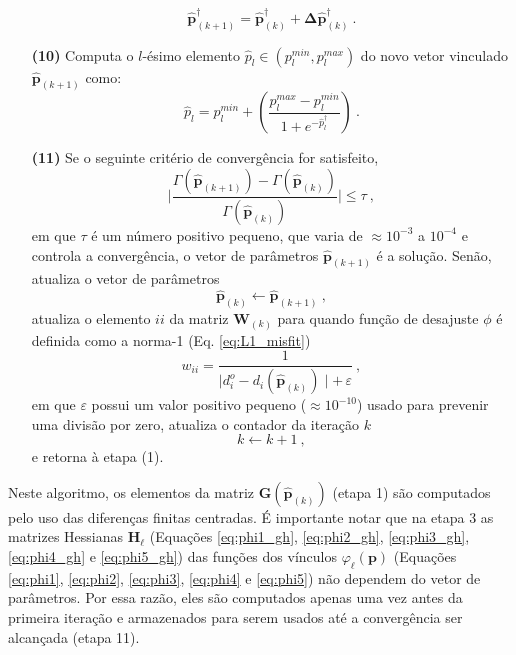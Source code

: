 \begin{itemize}
	$$
	\hat{\mathbf{p}}^{\dagger}_{(k+1)} = \hat{\mathbf{p}}^{\dagger}_{(k)} + \boldsymbol{\Delta}\hat{\mathbf{p}}^{\dagger}_{(k)} \: .
	$$
	\item[\textbf{(10)}] Computa o $l$-ésimo elemento $ \hat{p}_{l}\in (p^{min}_l, p^{max}_l) $ do novo vetor vinculado
	$\hat{\mathbf{p}}_{(k+1)}$ como:
	$$
	\hat{p}_{l} = p_{l}^{min} + \left(\frac{p_{l}^{max} - p_{l}^{min}}{ 1 + e^{-\hat{p}^{\dagger}_{l}} }\right) \: .
	$$
	\item[\textbf{(11)}] Se o seguinte critério de convergência for satisfeito,
	$$
	\Bigg|
	\frac{\Gamma(\hat{\mathbf{p}}_{(k+1)}) - \Gamma(\hat{\mathbf{p}}_{(k)})}
	{\Gamma(\hat{\mathbf{p}}_{(k)})} 
	\Bigg| \le \tau \: ,
	$$ 
	em que $\tau$ é um número positivo pequeno, que varia de $\approx 10^{-3}$ a 
	$10^{-4}$ e controla a convergência, o vetor de parâmetros $\hat{\mathbf{p}}_{(k+1)}$ é a solução. 
	Senão, atualiza o vetor de parâmetros 
	$$
	\hat{\mathbf{p}}_{(k)} \leftarrow \hat{\mathbf{p}}_{(k+1)} \: ,
	$$
	atualiza o elemento $ii$ da matriz $\mathbf{W}_{(k)}$ para quando função de desajuste $ \phi $ é definida como a norma-1 (Eq. \ref{eq:L1_misfit})
	$$
	w_{ii} = \frac{1}{\mid d_{i}^{o} -d_{i}(\hat{\mathbf{p}}_{(k)}) \mid + 
		\, \varepsilon} \: ,
	$$
	em que $\varepsilon$ possui um valor positivo pequeno ($\approx 10^{-10}$) usado
	para prevenir uma divisão por zero, atualiza o contador da iteração $k$
	$$
	k \leftarrow k + 1 \: ,
	$$
	e retorna à etapa (1).
\end{itemize}

Neste algoritmo, os elementos da matriz $\mathbf{G}(\hat{\mathbf{p}}_{(k)})$ 
(etapa 1) são computados pelo uso das diferenças finitas centradas.
É importante notar que na etapa 3 as matrizes Hessianas $\mathbf{H}_{\ell}$ (Equações \ref{eq:phi1_gh}, \ref{eq:phi2_gh}, \ref{eq:phi3_gh}, \ref{eq:phi4_gh} e \ref{eq:phi5_gh})
das funções dos vínculos $\varphi_{\ell}(\mathbf{p})$ 
(Equações \ref{eq:phi1}, \ref{eq:phi2}, \ref{eq:phi3}, \ref{eq:phi4} e \ref{eq:phi5}) 
não dependem do vetor de parâmetros. Por essa razão, eles são computados apenas uma vez antes da primeira iteração e armazenados para serem usados até a convergência ser alcançada (etapa 11).

